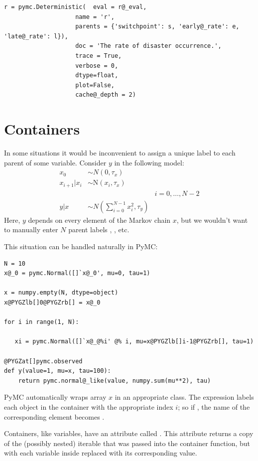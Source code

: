 \documentclass[letterpaper,10pt,english]{sphinxmanual}
\begin{document}
\begin{description}
\begin{Verbatim}[commandchars=@\[\]]
r = pymc.Deterministic(  eval = r@_eval,
                    name = 'r',
                    parents = {'switchpoint': s, 'early@_rate': e, 'late@_rate': l}),
                    doc = 'The rate of disaster occurrence.',
                    trace = True,
                    verbose = 0,
                    dtype=float,
                    plot=False,
                    cache@_depth = 2)
\end{Verbatim}

\end{description}


\section{Containers}
\label{modelbuilding:containers}
In some situations it would be inconvenient to assign a unique label to each
parent of some variable. Consider $y$ in the following model:
\begin{align*}
    x_0 &\sim N (0,\tau_x)\\
    x_{i+1}|x_i &\sim \text{N}(x_i, \tau_x)\\
    &&i=0,\ldots, N-2\\
    y|x &\sim N \left(\sum_{i=0}^{N-1}x_i^2,\tau_y\right)
\end{align*}
Here, $y$ depends on every element of the Markov chain $x$, but we
wouldn't want to manually enter $N$ parent labels , ,
etc.

This situation can be handled naturally in PyMC:

\begin{Verbatim}[commandchars=@\[\]]
     N = 10
x@_0 = pymc.Normal([]`x@_0', mu=0, tau=1)

x = numpy.empty(N, dtype=object)
x@PYGZlb[]0@PYGZrb[] = x@_0

for i in range(1, N):

   xi = pymc.Normal([]`x@_@%i' @% i, mu=x@PYGZlb[]i-1@PYGZrb[], tau=1)

@PYGZat[]pymc.observed
def y(value=1, mu=x, tau=100):
    return pymc.normal@_like(value, numpy.sum(mu**2), tau)
\end{Verbatim}

PyMC automatically wraps array $x$ in an appropriate  class. The expression  labels each  object in the container with the appropriate index $i$; so if , the name of the
corresponding element becomes .

Containers, like variables, have an attribute called . This attribute returns a copy of the (possibly nested) iterable that was passed into the container function, but with each variable inside replaced with its corresponding value.
\end{document}
